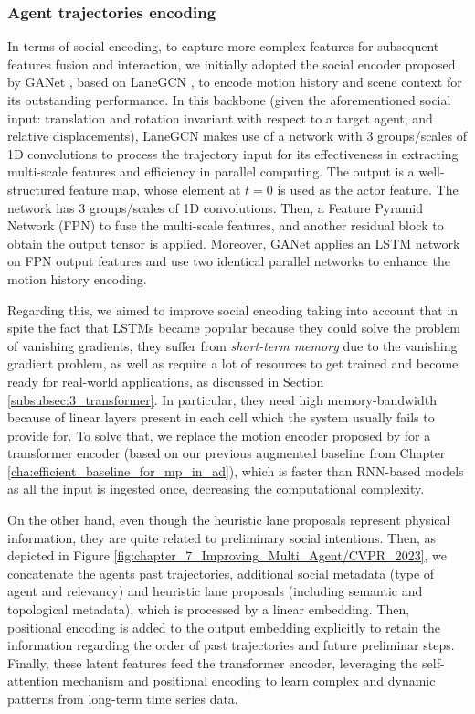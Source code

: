 \subsubsection{Agent trajectories encoding}
\label{subsubsec:7_improving_trajectories_encoding}

In terms of social encoding, to capture more complex features for subsequent features fusion and interaction, we initially adopted the social encoder proposed by GANet \cite{wang2022ganet}, based on LaneGCN \cite{liang2020learning}, to encode motion history and scene context for its outstanding performance. In this backbone (given the aforementioned social input: translation and rotation invariant with respect to a target agent, and relative displacements), LaneGCN makes use of a network with $3$ groups/scales of 1D convolutions to process the trajectory input for its effectiveness in extracting multi-scale features and efficiency in parallel computing. The output is a well-structured feature map, whose element at $t=0$ is used as the actor feature. The network has $3$ groups/scales of 1D convolutions. Then, a Feature Pyramid Network (FPN) \cite{lin2017feature} to fuse the multi-scale features, and another residual block to obtain the output tensor is applied. Moreover, GANet applies an \ac{LSTM} network on FPN output features and use two identical parallel networks to enhance the motion history encoding.

Regarding this, we aimed to improve social encoding taking into account that in spite the fact that \acp{LSTM} became popular because they could solve the problem of vanishing gradients, they suffer from \textit{short-term memory} due to the vanishing gradient problem, as well as require a lot of resources to get trained and become ready for real-world applications, as discussed in Section \ref{subsubsec:3_transformer}. In particular, they need high memory-bandwidth because of linear layers present in each cell which the system usually fails to provide for. To solve that, we replace the motion encoder proposed by \cite{wang2022ganet} for a transformer encoder (based on our previous augmented baseline from Chapter \ref{cha:efficient_baseline_for_mp_in_ad}), which is faster than \ac{RNN}-based models as all the input is ingested once, decreasing the computational complexity. 

On the other hand, even though the heuristic lane proposals represent physical information, they are quite related to preliminary social intentions. Then, as depicted in Figure \ref{fig:chapter_7_Improving_Multi_Agent/CVPR_2023}, we concatenate the agents past trajectories, additional social metadata (type of agent and relevancy) and heuristic lane proposals (including semantic and topological metadata), which is processed by a linear embedding. Then, positional encoding is added to the output embedding explicitly to retain the information regarding the order of past trajectories and future preliminar steps. Finally, these latent features feed the transformer encoder, leveraging the self-attention mechanism and positional encoding to learn complex and dynamic patterns from long-term time series data. 

